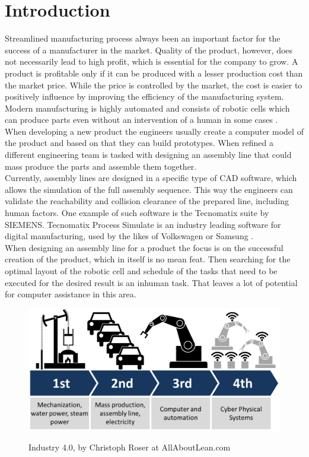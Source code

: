 \chapter{Introduction}
\label{ch:introduction}
\graphicspath{ {chapters/Introduction/} }

Streamlined manufacturing process always been an important factor for the success of a manufacturer in the market. 
Quality of the product, however, does not necessarily lead to high profit, which is essential for the company to grow. 
A product is profitable only if it can be produced with a lesser production cost than the market price. 
While the price is controlled by the market, the cost is easier to positively influence by improving the efficiency of the manufacturing system. 
Modern manufacturing is highly automated and consists of robotic cells which can produce parts even without an intervention of a human in some cases \cite{VirtualCommisioning}. \\

When developing a new product the engineers usually create a computer model of the product and based on that they can build prototypes. 
When refined a different engineering team is tasked with designing an assembly line that could mass produce the parts and assemble them together. \\
 
Currently, assembly lines are designed in a specific type of CAD software, which allows the simulation of the full assembly sequence.
This way the engineers can validate the reachability and collision clearance of the prepared line, including human factors.
One example of such software is the Tecnomatix suite by SIEMENS. Tecnomatix Process Simulate is an industry leading software for digital manufacturing, used by the likes of Volkswagen or Samsung \cite{TecnomatixCustomers}. \\ 

When designing an assembly line for a product the focus is on the successful creation of the product, which in itself is no mean feat. 
Then searching for the optimal layout of the robotic cell and schedule of the tasks that need to be executed for the desired result is an inhuman task. That leaves a lot of potential for computer assistance in this area. \\ 

\begin{figure}[h]
	\caption{Industry 4.0, by Christoph Roser at AllAboutLean.com}
	\centering
	  \includegraphics[width=1\textwidth]{industry-40.png}
	\label{fig:Industry40}
\end{figure}

